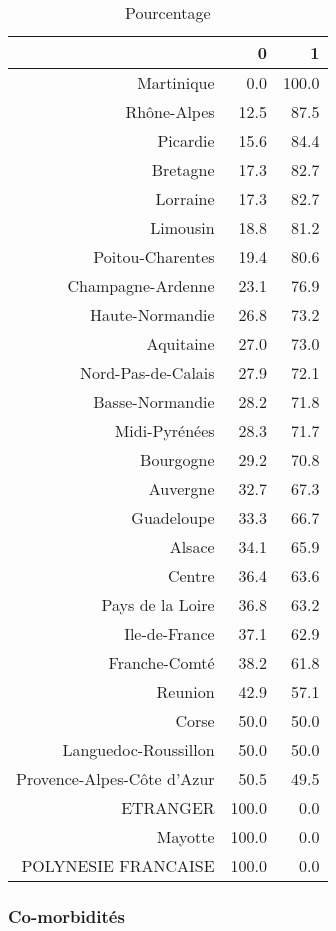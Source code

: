 \documentclass[11pt,a4paper]{article}\usepackage[]{graphicx}\usepackage[]{color}
\begin{document}
\begin{table}[H]
\centering
\begin{tabular}{rrr}
  \hline
 & 0 & 1 \\ 
  \hline
Martinique & 0.0 & 100.0 \\ 
  Rhône-Alpes & 12.5 & 87.5 \\ 
  Picardie & 15.6 & 84.4 \\ 
  Bretagne & 17.3 & 82.7 \\ 
  Lorraine & 17.3 & 82.7 \\ 
  Limousin & 18.8 & 81.2 \\ 
  Poitou-Charentes & 19.4 & 80.6 \\ 
  Champagne-Ardenne & 23.1 & 76.9 \\ 
  Haute-Normandie & 26.8 & 73.2 \\ 
  Aquitaine & 27.0 & 73.0 \\ 
  Nord-Pas-de-Calais & 27.9 & 72.1 \\ 
  Basse-Normandie & 28.2 & 71.8 \\ 
  Midi-Pyrénées & 28.3 & 71.7 \\ 
  Bourgogne & 29.2 & 70.8 \\ 
  Auvergne & 32.7 & 67.3 \\ 
  Guadeloupe & 33.3 & 66.7 \\ 
  Alsace & 34.1 & 65.9 \\ 
  Centre & 36.4 & 63.6 \\ 
  Pays de la Loire & 36.8 & 63.2 \\ 
  Ile-de-France & 37.1 & 62.9 \\ 
  Franche-Comté & 38.2 & 61.8 \\ 
  Reunion & 42.9 & 57.1 \\ 
  Corse & 50.0 & 50.0 \\ 
  Languedoc-Roussillon & 50.0 & 50.0 \\ 
  Provence-Alpes-Côte d'Azur & 50.5 & 49.5 \\ 
  ETRANGER & 100.0 & 0.0 \\ 
  Mayotte & 100.0 & 0.0 \\ 
  POLYNESIE FRANCAISE & 100.0 & 0.0 \\ 
   \hline
\end{tabular}
\caption{Pourcentage} 
\end{table}


      \subsubsection{Co-morbidités}
\end{document}
